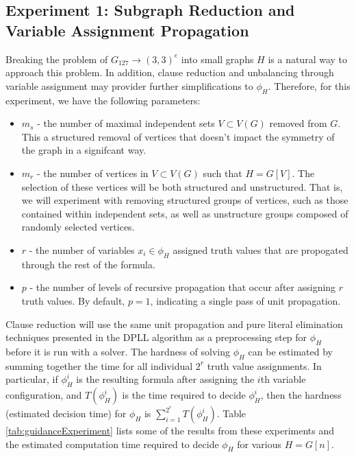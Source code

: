 \documentclass[paper=a4, fontsize=11pt]{scrartcl} %
\begin{document}
\subsection{Experiment 1: Subgraph Reduction and Variable Assignment Propagation}
Breaking the problem of $G_{127} \to (3,3)^e$ into small graphs $H$ is a natural way
to approach this problem. In addition, clause reduction and unbalancing through
variable assignment may provider further simplifications to $\phi_H$.
Therefore, for this experiment, we have the following parameters:
\begin{itemize}
	\item $m_s$ - the number of maximal independent sets $V \subset V(G)$ removed from $G$. This a structured removal of vertices that doesn't impact the symmetry of the graph in a signifcant way.
	\item $m_r$ - the number of vertices in $V \subset V(G)$ such that $H = G[V]$. The selection of
	these vertices will be both structured and unstructured. That is, we will experiment
	with removing structured groups of vertices, such as those contained within independent 
	sets, as well as unstructure groups composed of randomly selected vertices.
	\item $r$ - the number of variables $x_i \in \phi_H$ assigned truth values that are
	propogated through the rest of the formula. 
	\item $p$ - the number of levels of recursive propagation that occur after assigning 
	$r$ truth values. By default, $p = 1$, indicating a single pass of unit propagation.
\end{itemize}
Clause reduction will use the same unit propagation and pure literal elimination techniques
presented in the DPLL algorithm as a preprocessing step for $\phi_H$ before it is run with a solver.
The hardness of solving $\phi_H$ can be estimated by summing together the time for
all individual $2^r$ truth value assignments. In particular, if $\phi_H^i$ is the
resulting formula after assigning the $i$th variable configuration, and $T(\phi_H^i)$ 
is the time required to decide $\phi_H^i$, then the hardness (estimated decision time)
for $\phi_H$ is $\sum_{i = 1}^{2^r} T(\phi_H^i)$. Table \ref{tab:guidanceExperiment}
lists some of the results from these experiments and the estimated computation time
required to decide $\phi_H$ for various $H = G[n]$.
\end{document}
